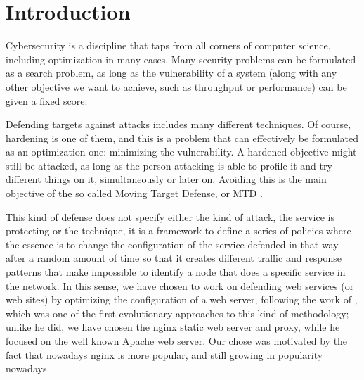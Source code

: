 \documentclass[sigconf]{acmart}
\begin{document}


\maketitle


\section{Introduction}

Cybersecurity is a discipline that taps from all corners of computer
science, including optimization in many cases. Many security problems
can be formulated as a search problem, as long as the vulnerability of
a system (along with any other objective we want to achieve, such as
throughput or performance) can be given a fixed score.

Defending targets against attacks includes many different
techniques. Of course, hardening is one of them, and this is a problem
that can effectively be formulated as an optimization one: minimizing
the vulnerability. A hardened objective might still be attacked, as
long as the person attacking is able to profile it and try different
things on it, simultaneously or later on. Avoiding this is the main
objective of the so called Moving Target Defense, or MTD
\cite{moving-target,jajodia2011moving,Cai2016}.

This kind of defense does not specify either the kind of attack, the
service is protecting or the technique, it is a framework to define a
series of policies where the essence is to change the configuration of the
service defended in that way after a random amount of time so that it
creates different traffic and response patterns that make impossible
to identify a node that does a specific service in the network. In
this sense, we have chosen to work on defending web services (or web
sites) by optimizing the configuration of a web server, following the
work of \cite{john_evolutionary_2014}, which was one of the first
evolutionary approaches to this kind of methodology; unlike he did, we
have chosen the {\sf nginx} static web server and proxy, while he
focused on the well known Apache web server. Our chose was motivated
by the fact that nowadays {\sf nginx} is more popular, and still
growing in popularity nowadays.
\end{document}

